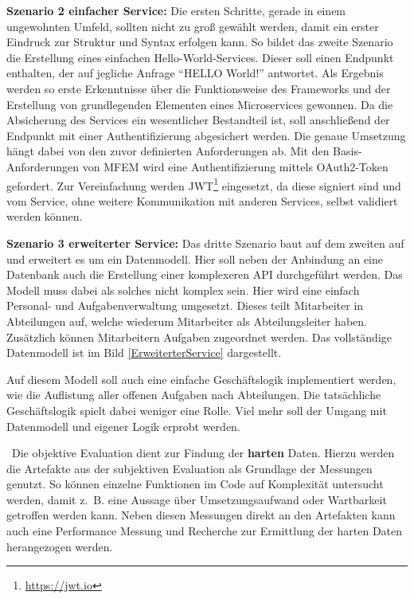\textbf{Szenario 2 einfacher Service:} Die ersten Schritte, gerade in einem ungewohnten Umfeld, sollten nicht zu groß gewählt werden, damit ein erster Eindruck zur Struktur und Syntax erfolgen kann. So bildet das zweite Szenario die Erstellung eines einfachen Hello-World-Services. Dieser soll einen Endpunkt enthalten, der auf jegliche Anfrage \enquote{HELLO World!} antwortet. Als Ergebnis werden so erste Erkenntnisse über die Funktionsweise des Frameworks und der Erstellung von grundlegenden Elementen eines Microservices gewonnen. Da die Absicherung des Services ein wesentlicher Bestandteil ist, soll anschließend der Endpunkt mit einer Authentifizierung abgesichert werden. Die genaue Umsetzung hängt dabei von den zuvor definierten Anforderungen ab. 
Mit den Basis-Anforderungen von \ac{MFEM} wird eine Authentifizierung mittels OAuth2-Token gefordert. Zur Vereinfachung werden \ac{JWT}\footnote{\url{https://jwt.io}} eingesetzt, da diese signiert sind und vom Service, ohne weitere Kommunikation mit anderen Services, selbst validiert werden können.   


\textbf{Szenario 3 erweiterter Service:} Das dritte Szenario baut auf dem zweiten auf und erweitert es um ein Datenmodell. Hier soll neben der Anbindung an eine Datenbank auch die Erstellung einer komplexeren API durchgeführt werden. Das Modell muss dabei als solches nicht komplex sein. Hier wird eine einfach Personal- und Aufgabenverwaltung umgesetzt. Dieses teilt Mitarbeiter in Abteilungen auf, welche wiederum Mitarbeiter als Abteilungsleiter haben. Zusätzlich können Mitarbeitern Aufgaben zugeordnet werden. Das vollständige Datenmodell ist im Bild \ref{ErweiterterService} dargestellt.


Auf diesem Modell soll auch eine einfache Geschäftslogik implementiert werden, wie die Auflistung aller offenen Aufgaben nach Abteilungen. Die tatsächliche Geschäftslogik spielt dabei weniger eine Rolle. Viel mehr soll der Umgang mit Datenmodell und eigener Logik erprobt werden.

	
\
Die objektive Evaluation dient zur Findung der \textbf{harten} Daten. Hierzu werden die Artefakte aus der subjektiven Evaluation als Grundlage der Messungen genutzt. So können einzelne Funktionen im Code auf Komplexität untersucht werden, damit z.~B. eine Aussage über Umsetzungsaufwand oder Wartbarkeit getroffen werden kann. Neben diesen Messungen direkt an den Artefakten kann auch eine Performance Messung und Recherche zur Ermittlung der harten Daten herangezogen werden. 

